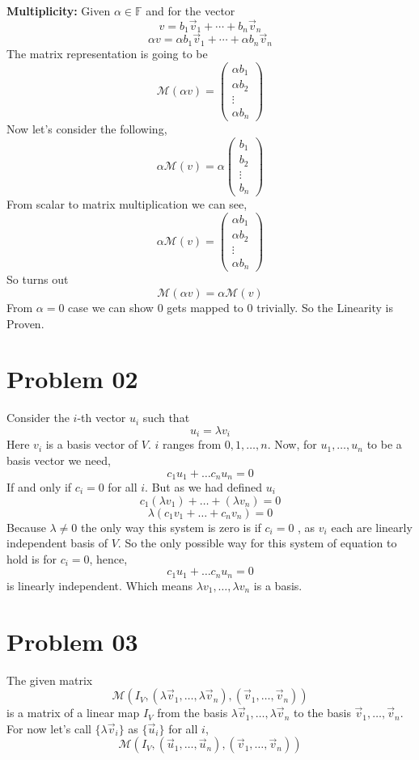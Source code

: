 \documentclass[letter]{article}
\begin{document}
\textbf{Multiplicity:} Given $\alpha \in \mathbb{F}$ and for the vector 
\[
v = b_1 \vec{v}_1 + \cdots + b_n \vec{v}_n 
\]
\[
\alpha v = \alpha b_1 \vec{v}_1 + \cdots + \alpha b_n \vec{v}_n 
\]The matrix representation is going to be
\[
\mathcal M(\alpha v) = 
\begin{pmatrix} \alpha b_1 \\ \alpha b_2 \\ \vdots \\ \alpha b_n  \end{pmatrix} 
\] 
Now let's consider the following, 
\[
\alpha \mathcal M (v) = \alpha  
\begin{pmatrix} b_1 \\ b_2 \\ \vdots \\ b_n \end{pmatrix} 
\]
From scalar to matrix multiplication we can see, 
\[
\alpha \mathcal M(v) = 
\begin{pmatrix} \alpha b_1 \\ \alpha b_2 \\ \vdots \\ \alpha b_n  \end{pmatrix} 
\] 
So turns out $$\mathcal M(\alpha v) = \alpha \mathcal M (v)$$
From $\alpha = 0$ case we can show $0$ gets mapped to $0$ trivially. So the Linearity is Proven. 

\section*{Problem 02} 
Consider the $i$-th vector $u_i$ such that 
\[
u_i = \lambda v_i
\]
Here $v_i$ is a basis vector of $V$. $i$ ranges from $0 , 1, \ldots, n$. Now, for $u_1, \ldots, u_n$ to be a basis vector we need, 
\[
c_1 u_1 + \ldots c_n u_n = 0
\]
If and only if $c_i = 0$ for all $i$. But as we had defined $u_i$
\[
c_1 \left(\lambda v_1\right) + \ldots + \left(\lambda v_n \right) = 0
\] 
\[
\lambda \left(c_1 v_1 + \ldots + c_n v_n \right) = 0
\]
Because $\lambda \neq  0$ the only way this system is zero is if $c_i = 0$ , as $v_i$ each are linearly independent basis of $V$. So the only possible way for this system of equation to hold is for $c_i = 0$, hence,  
\[
c_1 u_1 + \ldots c_n u_n = 0
\] 
is linearly independent. Which means $\lambda v_1 , \ldots, \lambda v_n $ is a basis.

\section*{Problem 03} 
The given matrix 
\[
\mathcal M (I_V , \left(\lambda \vec{v}_1, \ldots, \lambda \vec{v}_n\right) , 
\left(\vec{v}_1, \ldots, \vec{v}_n\right))
\]
is a matrix of a linear map $I_V$ from the basis $\lambda \vec{v}_1 ,\ldots, \lambda \vec{v}_n$ to the basis $\vec{v}_1, \ldots, \vec{v}_n$. For now let's call $\{\lambda\vec{v}_i\} $ as $\{\vec{u}_i\} $ for all $i$, 
\[
\mathcal M (I_V , \left(\vec{u}_1 ,\ldots, \vec{u}_n\right), 
\left(\vec{v}_1, \ldots, \vec{v}_n\right))
\]
\end{document}
